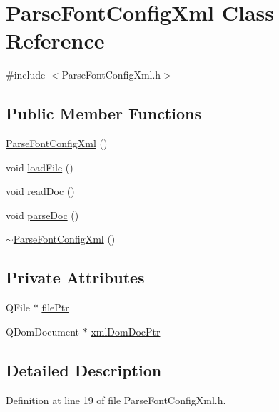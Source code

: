 \hypertarget{class_parse_font_config_xml}{\section{Parse\-Font\-Config\-Xml Class Reference}
\label{class_parse_font_config_xml}
}


{\ttfamily \#include $<$Parse\-Font\-Config\-Xml.\-h$>$}

\subsection*{Public Member Functions}
\begin{DoxyCompactItemize}
\item 
\hyperlink{class_parse_font_config_xml_a1c9f5e4c1a1637a3082ec914faf151d9}{Parse\-Font\-Config\-Xml} ()
\item 
void \hyperlink{class_parse_font_config_xml_a7e9e716a195b2d34aa86cd0bfe30ff4f}{load\-File} ()
\item 
void \hyperlink{class_parse_font_config_xml_a4453e6da18e869c57d187c0cc8ac3ba0}{read\-Doc} ()
\item 
void \hyperlink{class_parse_font_config_xml_ad3e9ffe38d0d4eef36d6bb4f7a3a20db}{parse\-Doc} ()
\item 
\hyperlink{class_parse_font_config_xml_a09f500614368657342378a7b72a04dfa}{$\sim$\-Parse\-Font\-Config\-Xml} ()
\end{DoxyCompactItemize}
\subsection*{Private Attributes}
\begin{DoxyCompactItemize}
\item 
Q\-File $\ast$ \hyperlink{class_parse_font_config_xml_a1b42e0d21b2363d136c4f8f3449db672}{file\-Ptr}
\item 
Q\-Dom\-Document $\ast$ \hyperlink{class_parse_font_config_xml_ac1f584710fc22d628bdca0e71308bffe}{xml\-Dom\-Doc\-Ptr}
\end{DoxyCompactItemize}


\subsection{Detailed Description}


Definition at line 19 of file Parse\-Font\-Config\-Xml.\-h.




